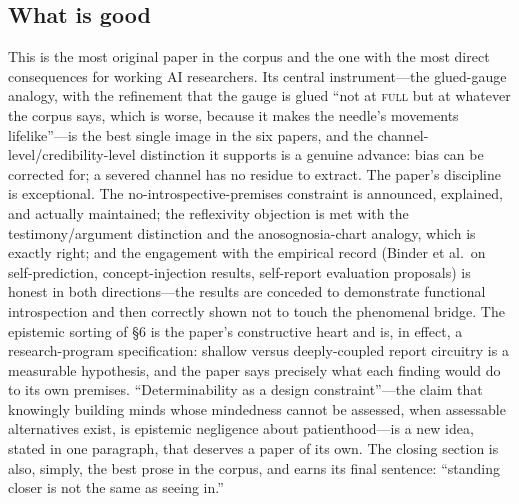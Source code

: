 \documentclass[11pt]{article}
\begin{document}
\subsection{What is good}
This is the most original paper in the corpus and the one with the most direct consequences for working AI researchers. Its central instrument---the glued-gauge analogy, with the refinement that the gauge is glued ``not at \textsc{full} but at whatever the corpus says, which is worse, because it makes the needle's movements lifelike''---is the best single image in the six papers, and the channel-level/credibility-level distinction it supports is a genuine advance: bias can be corrected for; a severed channel has no residue to extract. The paper's discipline is exceptional. The no-introspective-premises constraint is announced, explained, and actually maintained; the reflexivity objection is met with the testimony/argument distinction and the anosognosia-chart analogy, which is exactly right; and the engagement with the empirical record (Binder et al.\ on self-prediction, concept-injection results, self-report evaluation proposals) is honest in both directions---the results are conceded to demonstrate functional introspection and then correctly shown not to touch the phenomenal bridge. The epistemic sorting of \S 6 is the paper's constructive heart and is, in effect, a research-program specification: shallow versus deeply-coupled report circuitry is a measurable hypothesis, and the paper says precisely what each finding would do to its own premises. ``Determinability as a design constraint''---the claim that knowingly building minds whose mindedness cannot be assessed, when assessable alternatives exist, is epistemic negligence about patienthood---is a new idea, stated in one paragraph, that deserves a paper of its own. The closing section is also, simply, the best prose in the corpus, and earns its final sentence: ``standing closer is not the same as seeing in.''
\end{document}

